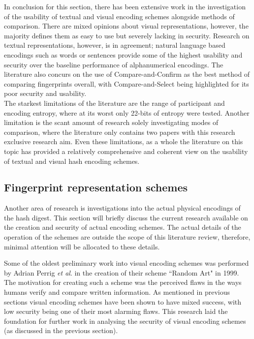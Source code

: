 In conclusion for this section, there has been extensive work in the investigation of the usability of textual and visual encoding schemes alongside methods of comparison. There are mixed opinions about visual representations, however, the majority defines them as easy to use but severely lacking in security. Research on textual representations, however, is in agreement; natural language based encodings such as words or sentences provide some of the highest usability and security over the baseline performance of alphanumerical encodings. The literature also concurs on the use of Compare-and-Confirm as the best method of comparing fingerprints overall, with Compare-and-Select being highlighted for its poor security and usability.\\
The starkest limitations of the literature are the range of participant and encoding entropy, where at its worst only 22-bits of entropy were tested. Another limitation is the scant amount of research solely investigating modes of comparison, where the literature only contains two papers with this research exclusive research aim. Even these limitations, as a whole the literature on this topic has provided a relatively comprehensive and coherent view on the usability of textual and visual hash encoding schemes.

\subsection{Fingerprint representation schemes}
Another area of research is investigations into the actual physical encodings of the hash digest. This section will briefly discuss the current research available on the creation and security of actual encoding schemes. The actual details of the operation of the schemes are outside the scope of this literature review, therefore, minimal attention will be allocated to these details.

Some of the oldest preliminary work into visual encoding schemes was performed by Adrian Perrig \textit{et al}\cite{perrig1999hash}. in the creation of their scheme ``Random Art" in 1999. The motivation for creating such a scheme was the perceived flaws in the ways humans verify and compare written information. As mentioned in previous sections visual encoding schemes have been shown to have mixed success, with low security being one of their most alarming flaws. This research laid the foundation for further work in analysing the security of visual encoding schemes (as discussed in the previous section).

